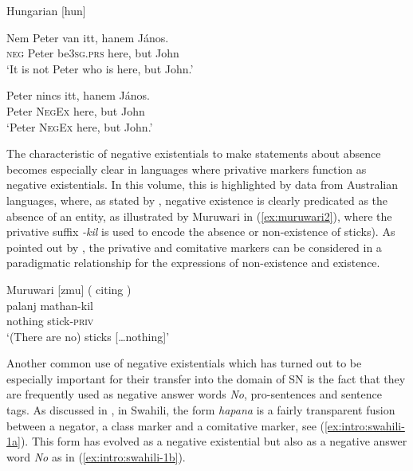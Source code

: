 \documentclass[output=paper,chinesefont,colorlinks,citecolor=brown]{langscibook}
\begin{document}
\begin{exe}
\ex Hungarian [hun] \citep[150]{degroot1994} \label{ex:hungarian1}
\begin{xlist}
\ex \label{ex:hungarian1a}
\gll Nem Peter van itt, hanem János.\\
\textsc{neg} Peter be\textsc{3sg.prs} here, but John\\
\glt `It is not Peter who is here, but John.'

\ex \label{ex:hungarian1b}
\gll *Peter nincs itt, hanem János.\\
Peter \textsc{NegEx} here, but John\\
\glt `Peter \textsc{NegEx} here, but John.'

\end{xlist}

\end{exe}
The characteristic of negative existentials to make statements about absence becomes especially clear in languages where privative markers function as negative existentials. In this volume, this is highlighted by data from Australian languages, where, as stated by , negative existence is clearly predicated as the absence of an entity, as illustrated by Muruwari in (\ref{ex:muruwari2}), where the privative suffix \textit{-kil} is used to encode the absence or non-existence of sticks). As pointed out by , the privative and comitative markers can be considered in a paradigmatic relationship for the expressions of non-existence and existence.

\begin{exe}
\ex Muruwari [zmu] ( citing {\citet[77]{Oates1988}}) \label{ex:muruwari2}\\
\gll  palanj mathan-kil\\
nothing stick-\textsc{priv}\\
\glt `(There are no) sticks [\ldots{}nothing]'
\end{exe}

Another common use of negative existentials which has turned out to be especially important for their transfer into the domain of SN is the fact that they are frequently used as negative answer words \textit{No}, pro-sentences and sentence tags. As discussed in , in Swahili, the form \textit{hapana} is a fairly transparent fusion between a negator, a class marker and a comitative marker, see (\ref{ex:intro:swahili-1a}). This form has evolved as a negative existential but also as a negative answer word \textit{No} as in (\ref{ex:intro:swahili-1b}).
\end{document}
